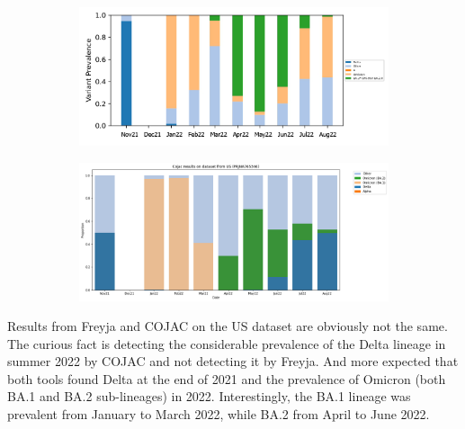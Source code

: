     \begin{figure}[H]
        \centering
        \begin{subfigure}[b]{1\textwidth}
        \includegraphics[width=1\textwidth]{figures/results/real/us-freyja-monthly.png}
        \label{fig:results:real:us-freyja-monthly}
        \end{subfigure}
        \hfill
        \begin{subfigure}[b]{0.9\textwidth}
        \includegraphics[width=1\textwidth]{figures/results/real/us-cojac-monthly.png}
        \label{fig:results:real:us-cojac-monthly}
        \end{subfigure}
        \hfill
    \end{figure}
    
    Results from Freyja and COJAC on the US dataset are obviously not the same. The curious fact is detecting the considerable prevalence of the Delta lineage in summer 2022 by COJAC and not detecting it by Freyja. And more expected that both tools found Delta at the end of 2021 and the prevalence of Omicron (both BA.1 and BA.2 sub-lineages) in 2022. Interestingly, the BA.1 lineage was prevalent from January to March 2022, while BA.2 from April to June 2022.
    
